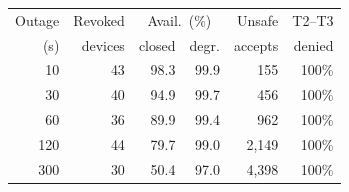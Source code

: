 \begin{tabular}{@{}rrrrrr@{}}
\toprule
Outage & Revoked & \multicolumn{2}{c}{Avail.\ (\%)} & Unsafe & T2--T3 \\
(s) & devices & closed & degr. & accepts & denied \\
\midrule
10 & 43 & 98.3 & 99.9 & 155 & 100\% \\
30 & 40 & 94.9 & 99.7 & 456 & 100\% \\
60 & 36 & 89.9 & 99.4 & 962 & 100\% \\
120 & 44 & 79.7 & 99.0 & 2{,}149 & 100\% \\
300 & 30 & 50.4 & 97.0 & 4{,}398 & 100\% \\
\bottomrule
\end{tabular}
